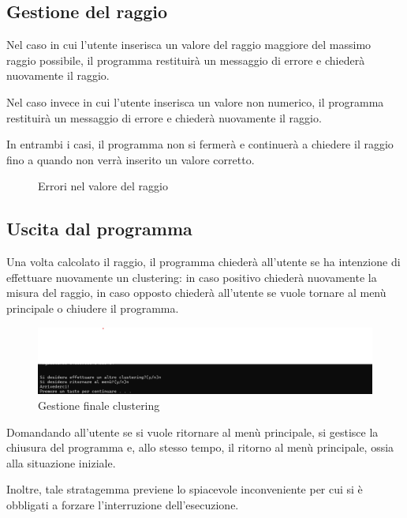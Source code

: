 \subsection*{Gestione del raggio}

Nel caso in cui l'utente inserisca un valore del raggio maggiore del massimo raggio possibile, il programma restituirà un messaggio di errore e chiederà nuovamente il raggio.

Nel caso invece in cui l'utente inserisca un valore non numerico, il programma restituirà un messaggio di errore e chiederà nuovamente il raggio.

In entrambi i casi, il programma non si fermerà e continuerà a chiedere il raggio fino a quando non verrà inserito un valore corretto.

\begin{figure}[h!]
    \centering
    \hfill
    \caption{Errori nel valore del raggio}
\end{figure}

\subsection*{Uscita dal programma}
Una volta calcolato il raggio, il programma chiederà all'utente se ha intenzione di effettuare nuovamente un clustering: in caso positivo chiederà nuovamente la misura del raggio, in caso opposto chiederà all'utente se vuole tornare al menù principale o chiudere il programma. 


\begin{figure}[h]
    \centering
    \includegraphics[width = .5\textwidth]{images/richeista continuazione.png}
    \caption{Gestione finale clustering}
\end{figure}

Domandando all'utente se si vuole ritornare al menù principale, si gestisce la chiusura del programma e, allo stesso tempo, il ritorno al menù principale, ossia alla situazione iniziale. 

Inoltre, tale stratagemma previene lo spiacevole inconveniente per cui si è obbligati a forzare l'interruzione dell'esecuzione.

